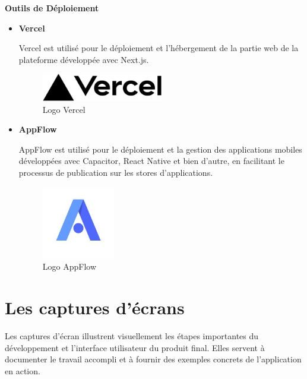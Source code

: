 \textbf{Outils de Déploiement}
\begin{itemize}
  \item \textbf{Vercel}

    Vercel est utilisé pour le déploiement et l'hébergement de la partie web
    de la plateforme développée avec Next.js.

    \begin{figure}[H]
      \centering
      \includegraphics[width=0.5\textwidth]{images/Vercel_logo_black.svg.png}
      \caption{Logo Vercel}
    \end{figure}

  \item \textbf{AppFlow}

    AppFlow est utilisé pour le déploiement et la gestion des applications
    mobiles développées avec Capacitor, React Native et bien d'autre, en
    facilitant le processus de publication
    sur les stores d'applications.

    \begin{figure}[H]
      \centering
      \includegraphics[width=0.3\textwidth]{images/AppFlow.png}
      \caption{Logo AppFlow}
    \end{figure}
\end{itemize}


\section{Les captures d'écrans}
Les captures d’écran illustrent visuellement les étapes importantes du
développement et l’interface utilisateur du produit final. Elles servent à
documenter le travail accompli et à fournir des exemples concrets de
l’application en action.

